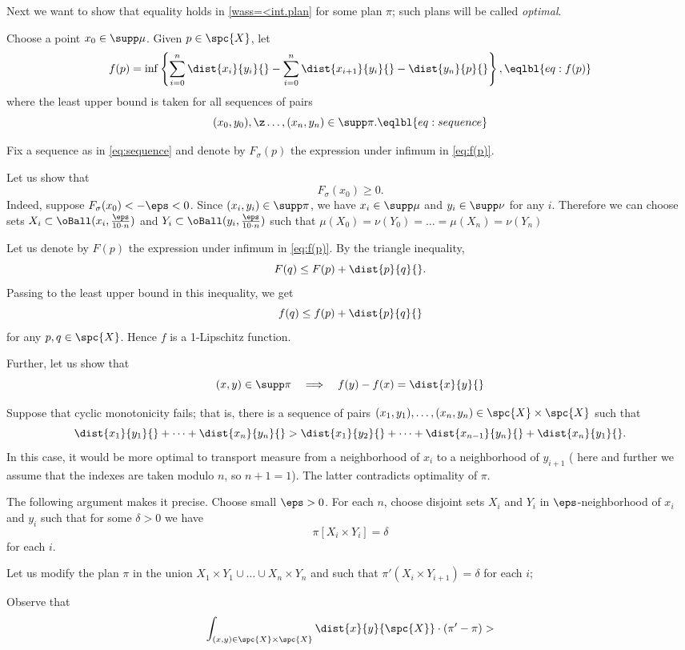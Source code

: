 Next we want to show that equality holds in \ref{wass=<int.plan} for some plan $\pi$; such plans will be called \emph{optimal}.


Choose a point $x_0\in \supp\mu$.
Given  $p\in \spc{X}$,
let
\[f(p)=\inf\left\{\sum_{i=0}^n\dist{x_i}{y_i}{}-\sum_{i=0}^n\dist{x_{i+1}}{y_i}{}-\dist{y_n}{p}{}\right\},
\eqlbl{eq:f(p)}\]
where the least upper bound is taken for all sequences of pairs 
\[(x_0,y_0),\z\dots,(x_n,y_n)\in \supp\pi.\eqlbl{eq:sequence}\]

Fix a sequence as in \ref{eq:sequence} and  denote by $F_\sigma(p)$ the expression under infimum in \ref{eq:f(p)}.

Let us show that 
\[F_\sigma(x_0)\ge 0.\]
Indeed, suppose $F_\sigma(x_0)<-\eps<0$.
Since $(x_i,y_i)\in \supp\pi$, we have $x_i\in\supp\mu$ and $y_i\in\supp\nu$ for any $i$.
Therefore we can choose sets $X_i\subset \oBall(x_i,\tfrac{\eps}{10\cdot n})$ and $Y_i\subset \oBall(y_i,\tfrac{\eps}{10\cdot n})$ such that 
$\mu(X_0)=\nu(Y_0)=\dots=\mu(X_n)=\nu(Y_n)$



Let us denote by $F(p)$ the expression under infimum in \ref{eq:f(p)}.
By the triangle inequality, 
\[F(q)\le F(p)+\dist{p}{q}{}.\]
Passing to the least upper bound in this inequality, we get
\[f(q)\le f(p)+\dist{p}{q}{}\]
for any $p,q\in\spc{X}$.
Hence $f$ is a 1-Lipschitz function.

Further, let us show that
\[(x,y)\in\supp\pi
\quad\Longrightarrow\quad
f(y)-f(x)=\dist{x}{y}{}\]





Suppose that cyclic monotonicity fails;
that is, there is a sequence of pairs $(x_1,y_1),\dots,(x_n,y_n)\in\spc{X}\times\spc{X}$ such that
\[\dist{x_1}{y_1}{}+\dots+\dist{x_n}{y_n}{}
>
\dist{x_1}{y_2}{}+\dots+\dist{x_{n-1}}{y_n}{}+\dist{x_{n}}{y_1}{}.\]
In this case, it would be more optimal to transport measure from a neighborhood of $x_i$ to a neighborhood of $y_{i+1}$ (
here and further we assume that the indexes are taken modulo $n$, so $n+1=1$).
The latter contradicts optimality of $\pi$.

The following argument makes it precise.
Choose small $\eps>0$.
For each $n$,
choose disjoint sets $X_i$ and $Y_i$ in $\eps$-neighborhood of $x_i$ and $y_i$
such that for some $\delta>0$ we have 
\[\pi [X_i\times Y_i]=\delta\]
for each $i$.

Let us modify the plan $\pi$ in the union $X_1\times Y_1 \cup\dots\cup X_n\times Y_n$ and such that 
$\pi'(X_i\times Y_{i+1})=\delta$ for each $i$;


Observe that
\[\int_{(x,y)\in\spc{X}\times\spc{X}}\dist{x}{y}{\spc{X}}\cdot(\pi'-\pi)>\]
\qeds
